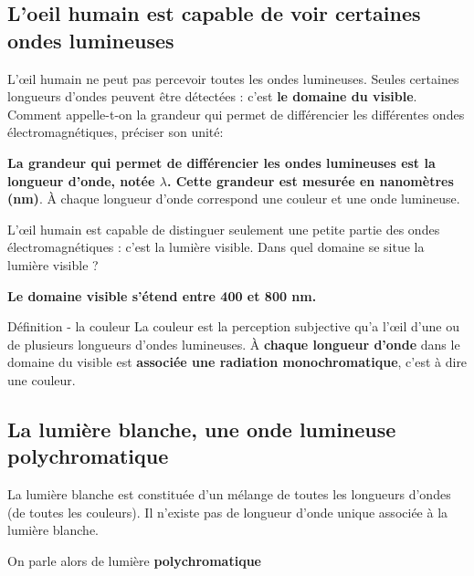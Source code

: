 \documentclass[french, a4paper, 12pt]{article}
\begin{document}
\subsection{L'oeil humain est capable de voir certaines ondes lumineuses}

L'\oe il humain ne peut pas percevoir toutes les ondes lumineuses. Seules certaines longueurs d'ondes peuvent être détectées : c'est \textbf{le domaine du visible}. Comment appelle-t-on la grandeur qui permet de différencier les différentes ondes électromagnétiques, préciser son unité:\bigskip 

\textbf{La grandeur qui permet de différencier les ondes lumineuses est la longueur d'onde, notée $\lambda$. Cette grandeur est mesurée en nanomètres (nm)}. À chaque longueur d'onde correspond une couleur et une onde lumineuse.\bigskip



L'\oe il humain est capable de distinguer seulement une petite partie des ondes électromagnétiques : c'est la lumière visible. Dans quel domaine se situe la lumière visible ?\bigskip 

\textbf{Le domaine visible s'étend entre 400 et 800 nm.}\bigskip



\begin{definition}{Définition - la couleur}
	La couleur est la perception subjective qu'a l'\oe il d'une ou de plusieurs longueurs d'ondes lumineuses. À \textbf{chaque longueur d'onde} dans le domaine du visible est \textbf{associée une radiation monochromatique}, c'est à dire une couleur.
\end{definition}

\subsection{La lumière blanche, une onde lumineuse polychromatique}

La lumière blanche est constituée d'un mélange de toutes les longueurs d'ondes (de toutes les couleurs). Il n'existe pas de longueur d'onde unique associée à la lumière blanche.\bigskip

\begin{center}
On parle alors de lumière \textbf{polychromatique}%
\end{center}
\end{document}
